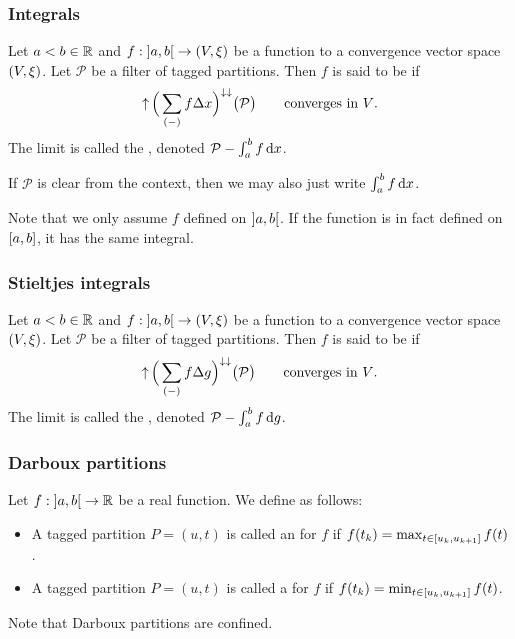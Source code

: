 \subsubsection{Integrals}
\begin{definition}
Let $a <  b\in \mathbb{R}$ and $f: \interval[o]{a,b}\to \sSet{V,\xi}$ be a function to a convergence vector space $\sSet{V,\xi}$. Let $\mathcal{P}$ be a filter of tagged partitions. Then $f$ is said to be  if
\[ \operatorname{\uparrow}\Big(\sum_{(-)}f\Delta x\Big)^{\downarrow\downarrow}\big(\mathcal{P}\big)\qquad \text{converges in $V$.} \]
The limit is called the , denoted $\mathcal{P}-\int_a^b f\operatorname{d \!}{x}$.
\end{definition}
If $\mathcal{P}$ is clear from the context, then we may also just write $\int_a^b f\operatorname{d \!}{x}$.

Note that we only assume $f$ defined on $\interval[o]{a,b}$. If the function is in fact defined on $\interval{a,b}$, it has the same integral.

\subsubsection{Stieltjes integrals}
\begin{definition}
Let $a <  b\in \mathbb{R}$ and $f: \interval[o]{a,b}\to \sSet{V,\xi}$ be a function to a convergence vector space $\sSet{V,\xi}$. Let $\mathcal{P}$ be a filter of tagged partitions. Then $f$ is said to be  if 
\[ \operatorname{\uparrow}\Big(\sum_{(-)}f\Delta g\Big)^{\downarrow\downarrow}\big(\mathcal{P}\big)\qquad \text{converges in $V$.} \]
The limit is called the , denoted $\mathcal{P}-\int_a^b f\operatorname{d \!}{g}$.
\end{definition}

\subsubsection{Darboux partitions}
\begin{definition}
Let $f: \interval[o]{a,b}\to \R$ be a real function. We define  as follows:
\begin{itemize}
\item A tagged partition $P = (u,t)$ is called an  for $f$ if $f(t_k) = \max_{t\in \interval{u_k, u_{k+1}}}f(t)$.
\item A tagged partition $P = (u,t)$ is called a  for $f$ if $f(t_k) = \min_{t\in \interval{u_k, u_{k+1}}}f(t)$.
\end{itemize}
\end{definition}
Note that Darboux partitions are confined.

